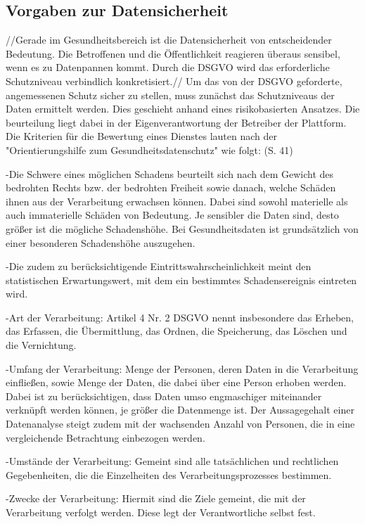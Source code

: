 \subsection{Vorgaben zur Datensicherheit}\label{subsection:vzd}
//Gerade im Gesundheitsbereich ist die Datensicherheit von entscheidender Bedeutung. Die Betroffenen und die Öffentlichkeit reagieren überaus sensibel, wenn es zu Datenpannen kommt. Durch die DSGVO wird das erforderliche Schutzniveau verbindlich konkretisiert.//
Um das von der DSGVO geforderte, angemessenen Schutz sicher zu stellen, muss zunächst das Schutzniveaus der Daten ermittelt werden.
Dies geschieht anhand eines risikobasierten Ansatzes. Die beurteilung liegt dabei in der Eigenverantwortung der Betreiber der Plattform. Die Kriterien für die Bewertung eines Dienstes lauten nach der "Orientierungshilfe zum Gesundheitsdatenschutz" wie folgt:
(S. 41)

-Die Schwere eines möglichen Schadens beurteilt sich nach dem Gewicht des bedrohten Rechts bzw. der bedrohten Freiheit sowie danach, welche Schäden ihnen aus der Verarbeitung erwachsen können. Dabei sind sowohl materielle als auch immaterielle Schäden von Bedeutung. Je sensibler die Daten sind, desto größer ist die mögliche Schadenshöhe. Bei Gesundheitsdaten ist grundsätzlich von einer besonderen Schadenshöhe auszugehen.

-Die zudem zu berücksichtigende Eintrittswahrscheinlichkeit meint den statistischen Erwartungswert, mit dem ein bestimmtes Schadensereignis eintreten wird.

-Art der Verarbeitung: Artikel 4 Nr. 2 DSGVO nennt insbesondere das Erheben, das Erfassen, die Übermittlung, das Ordnen, die Speicherung, das Löschen und die Vernichtung.

-Umfang der Verarbeitung: Menge der Personen, deren Daten in die Verarbeitung einfließen, sowie Menge der Daten, die dabei über eine Person erhoben werden. Dabei ist zu berücksichtigen, dass Daten umso engmaschiger miteinander verknüpft werden können, je größer die Datenmenge ist. Der Aussagegehalt einer Datenanalyse steigt zudem mit der wachsenden Anzahl von Personen, die in eine vergleichende Betrachtung einbezogen werden.

-Umstände der Verarbeitung: Gemeint sind alle tatsächlichen und rechtlichen Gegebenheiten, die die Einzelheiten des Verarbeitungsprozesses bestimmen.

-Zwecke der Verarbeitung: Hiermit sind die Ziele gemeint, die mit der Verarbeitung verfolgt werden. Diese legt der Verantwortliche selbst fest.

